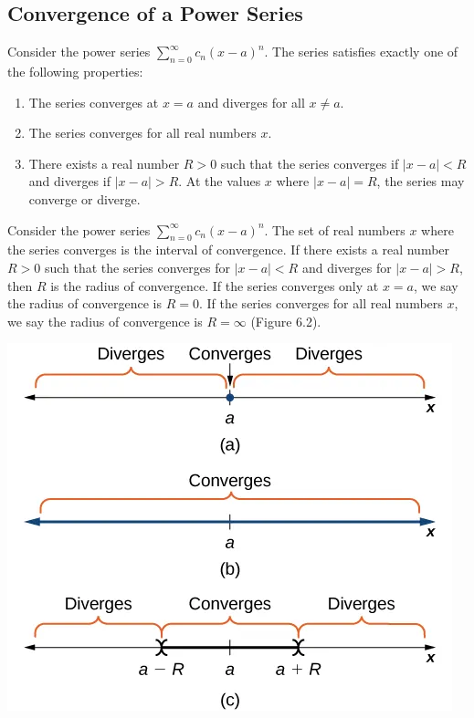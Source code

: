 \documentclass{report}
\begin{document}
    \subsection*{Convergence of a Power Series}
    \bigbreak \noindent 
    \begin{thrmm}
        Consider the power series \(\sum_{n=0}^{\infty} c_n (x - a)^n\). The series satisfies exactly one of the following properties:
        \begin{enumerate}[label=(\roman*)]
            \item The series converges at \( x = a \) and diverges for all \( x \neq a \).
            \item The series converges for all real numbers \( x \).
            \item There exists a real number \( R > 0 \) such that the series converges if \( |x - a| < R \) and diverges if \( |x - a| > R \). At the values \( x \) where \( |x - a| = R \), the series may converge or diverge.
        \end{enumerate}
    \end{thrmm}
    \bigbreak \noindent 
    \begin{dfn}
        Consider the power series \(\sum_{n=0}^{\infty} c_n (x - a)^n\). The set of real numbers \( x \) where the series converges is the interval of convergence. If there exists a real number \( R > 0 \) such that the series converges for \( |x - a| < R \) and diverges for \( |x - a| > R \), then \( R \) is the radius of convergence. If the series converges only at \( x = a \), we say the radius of convergence is \( R = 0 \). If the series converges for all real numbers \( x \), we say the radius of convergence is \( R = \infty \) (Figure 6.2).
    \end{dfn}
    \bigbreak \noindent 
    \begin{center}
        \includegraphics[scale=0.5]{./figures/popp.png}
    \end{center}
\end{document}
